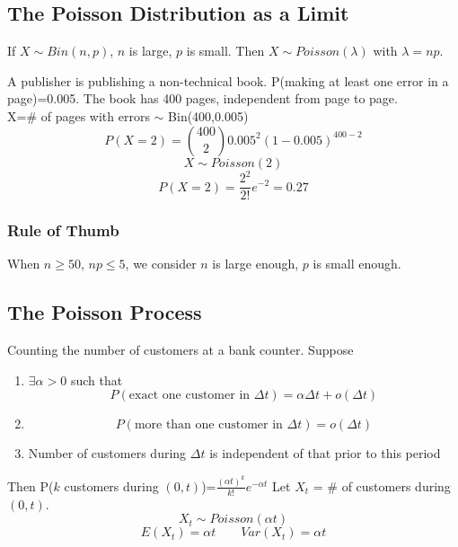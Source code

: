 \subsection{The Poisson Distribution as a Limit}
\begin{prop}
If $X \sim Bin(n,p)$, $n$ is large, $p$ is small. Then $X \sim Poisson(\lambda)$ with $\lambda=np$.
\end{prop}

\begin{exmp}
A publisher is publishing a non-technical book. P(making at least one error in a page)=0.005. The book has 400 pages, independent from page to page.\\
X=\# of pages with errors $\sim$ Bin(400,0.005)
\[P(X=2)=\binom {400}{2} 0.005^2 (1-0.005)^{400-2}\]
\[X \sim Poisson(2)\]
\[P(X=2)=\frac{2^2}{2!}e^{-2}=0.27\]
\end{exmp}

\subsubsection{Rule of Thumb}
When $n \geq 50$, $np \leq 5$, we consider $n$ is large enough, $p$ is small enough.

\subsection{The Poisson Process}
\begin{exmp}
Counting the number of customers at a bank counter. Suppose
\begin{enumerate}
\item $\exists \alpha > 0$ such that
\[P(\text{exact one customer in } \Delta t)=\alpha \Delta t +o(\Delta t)\]
\item \[P(\text{more than one customer in } \Delta t)=o(\Delta t)\]
\item Number of customers during $\Delta t$ is independent of that prior to this period
\end{enumerate}
Then P($k$ customers during $(0,t)$)=$\frac{(\alpha t)^k}{k!}e^{-\alpha t}$
Let $X_t$ = \# of customers during $(0,t)$.
\[X_t \sim Poisson(\alpha t)\]
\[E(X_t)=\alpha t \qquad Var(X_t)=\alpha t\]
\end{exmp}